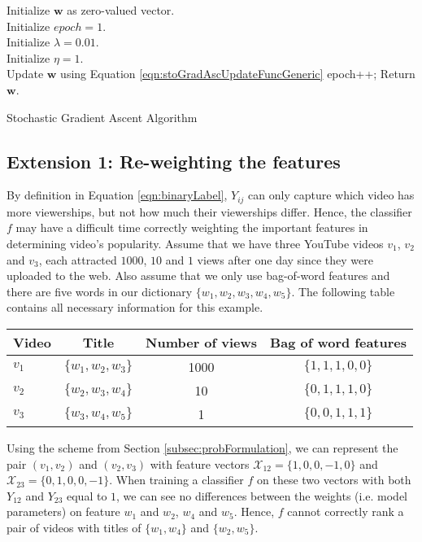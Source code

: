 	\begin{algorithm}[h]\small
		Initialize $\textbf{w}$ as zero-valued vector.\\
		Initialize $epoch = 1$.\\
		Initialize $\lambda = 0.01$.\\
		Initialize $\eta = 1$.\\
		 {
			 {
				Update $\textbf{w}$ using Equation \ref{eqn:stoGradAscUpdateFuncGeneric}
			}    
			epoch++;
		}
		Return $\textbf{w}$.
		\caption{Stochastic Gradient Ascent Algorithm} \label{algo:stoGradAsc}
	\end{algorithm}

\subsection{Extension 1: Re-weighting the features}
\label{subsec:ext1}
	By definition in Equation \ref{eqn:binaryLabel}, $Y_{ij}$ can only capture which video has more viewerships, but not how much their viewerships differ. Hence, the classifier $f$ may have a difficult time correctly weighting the important features in determining video's popularity. Assume that we have three YouTube videos $v_1$, $v_2$ and $v_3$, each attracted $1000$, $10$ and $1$ views after one day since they were uploaded to the web. Also assume that we only use bag-of-word features and there are five words in our dictionary $\{w_1, w_2, w_3, w_4, w_5\}$. The following table contains all necessary information for this example.

		\begin{center}
			\begin{tabular}{| l | c | c | c |}
					\hline
				Video & Title & Number of views & Bag of word features \\ \hline
				$v_1$ & $\{w_1, w_2, w_3\}$ &	1000 & $\{1, 1, 1, 0 ,0 \}$	\\ \hline
				$v_2$ & $\{w_2, w_3, w_4\}$ & 10 & $\{0, 1, 1, 1 ,0 \}$	\\ \hline
				$v_3$ & $\{w_3, w_4, w_5\}$ & 1 & $\{0, 0, 1, 1 ,1 \}$	\\ \hline
			\end{tabular}
		\end{center}

	Using the scheme from Section \ref{subsec:probFormulation}, we can represent the pair $(v_1, v_2)$ and $(v_2, v_3)$ with feature vectors $\mathcal{X}_{12}=\{1, 0, 0, -1, 0\}$ and $\mathcal{X}_{23}=\{0, 1, 0, 0 , -1 \}$. When training a classifier $f$ on these two vectors with both $Y_{12}$ and $Y_{23}$ equal to $1$, we can see no differences between the weights (i.e. model parameters) on feature $w_1$ and $w_2$, $w_4$ and $w_5$. Hence, $f$ cannot correctly rank a pair of videos with titles of $\{w_1, w_4\}$ and $\{w_2, w_5\}$.

